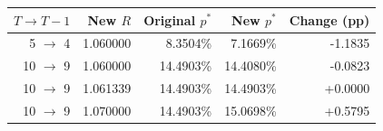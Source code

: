 \begin{tabular}{rrrrr}
\toprule
$T\to T-1$ & New $R$ & Original $p^*$ & New $p^*$ & Change (pp)\\
\midrule
5 $\to$ 4 & 1.060000 & 8.3504\% & 7.1669\% & -1.1835\\
10 $\to$ 9 & 1.060000 & 14.4903\% & 14.4080\% & -0.0823\\
10 $\to$ 9 & 1.061339 & 14.4903\% & 14.4903\% & +0.0000\\
10 $\to$ 9 & 1.070000 & 14.4903\% & 15.0698\% & +0.5795\\
\bottomrule
\end{tabular}
